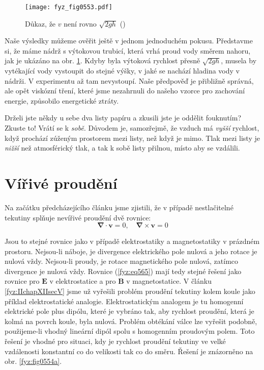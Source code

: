     \begin{figure}[ht!] %
      \centering
      \texttt{[image: fyz\_fig0553.pdf]}
      \caption{Důkaz, že \(v\) není rovno \(\sqrt{2gh}\)
               (\cite[s.~751]{Feynman02})}
      \label{fyz:fig0553}
    \end{figure}
    
    Naše výsledky můžeme ověřit ještě v jednom jednoduchém pokusu. Představme si, že máme nádrž s 
    výtokovou trubicí, která vrhá proud vody směrem nahoru, jak je ukázáno na obr. 
    \ref{fyz:fig0553}. Kdyby byla výtoková rychlost přesně \(\sqrt{2gh}\), musela by vytékající vody 
    vystoupit do stejné výšky, v jaké se nachází hladina vody v nádrži. V experimentu až tam 
    nevystoupí. Naše předpověď je přibližně správná, ale opět viskózní tření, které jsme nezahrnuli 
    do našeho vzorce pro zachování energie, způsobilo energetické ztráty.
    
    Drželi jste někdy u sebe dva listy papíru a zkusili jste je oddělit fouknutím? Zkuste to! Vrátí 
    se k \emph{sobě}. Důvodem je, samozřejmě, že vzduch má \emph{vyšší} rychlost, když prochází 
    zúženým prostorem mezi listy, než když je mimo. Tlak mezi listy je \emph{nižší} než 
    atmosférický tlak, a tak k sobě listy přilnou, místo aby se vzdálili.
    
  \section{Vířivé proudění}\label{fyz:IIchapXLsecIV}
    Na začátku předcházejícího článku jsme zjistili, že v případě nestlačitelné tekutiny splňuje 
    nevířivé proudění dvě rovnice:
    \begin{equation}\label{fyz:eq565}
      \symbf{\nabla}\cdot\bm{v} = 0, \quad \symbf{\nabla}\times\bm{v} = 0
    \end{equation}
    
    Jsou to stejné rovnice jako v případě elektrostatiky a magnetostatiky v prázdném prostoru. 
    Nejsou-li náboje, je divergence elektrického pole nulová a jeho rotace je nulová vždy. 
    Nejsou-li proudy, je rotace magnetického pole nulová, zatímco divergence je nulová vždy. 
    Rovnice (\ref{fyz:eq565}) mají tedy stejné řešení jako rovnice pro \(\bm{E}\) v elektrostatice 
    a pro \(\bm{B}\) v magnetostatice. V článku \ref{fyz:IIchapXIIsecV} jsme už vyřešili problém 
    proudění tekutiny kolem koule jako příklad elektrostatické analogie. Elektrostatickým analogem 
    je tu homogenní elektrické pole plus dipólu, které je vybráno tak, aby rychlost proudění, která 
    je kolmá na povrch koule, byla nulová. Problém obtékání válce lze vyřešit podobně, použijeme-li 
    vhodný lineární dipól spolu s homogenním proudovým polem. Toto řešení je vhodné pro situaci, 
    kdy je rychlost proudění tekutiny ve velké vzdálenosti konstantní co do velikosti tak co do 
    směru. Řešení je znázorněno na obr. \ref{fyz:fig0554a}.
    

